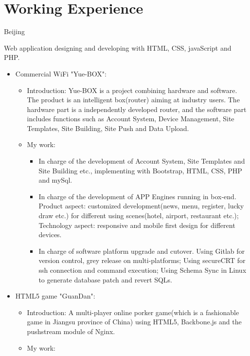 \documentclass[11pt,a4paper,sans]{moderncv}        %
\begin{document}
\section{Working Experience}
 {Beijing}{}
{Web application designing and developing with HTML, CSS, javaScript and PHP.
\newline{}%
\begin{itemize}%
\item Commercial WiFi "Yue-BOX":
  \begin{itemize}%
  \item Introduction: Yue-BOX is a project combining hardware and software. The product is an intelligent box(router) aiming at industry users. The hardware part is a independently developed router, and the software part includes functions such as Account System, Device Management, Site Templates, Site Building, Site Push and Data Upload.
  \item My work:
      \begin{itemize}%
        \item In charge of the development of Account System, Site Templates and Site Building etc., implementing with Bootstrap, HTML, CSS, PHP and mySql.
        \item In charge of the development of APP Engines running in box-end. Product aspect: customized development(news, menu, register, lucky draw etc.) for different using scenes(hotel, airport, restaurant etc.); Technology aspect: responsive and mobile first design for different devices.
        \item In charge of software platform upgrade and cutover. Using Gitlab for version control, grey release on multi-platforms; Using secureCRT for ssh connection and command execution; Using Schema Sync in Linux to generate database patch and revert SQLs.
      \end{itemize}
  \end{itemize}
\item HTML5 game "GuanDan":
  \begin{itemize}%
  \item Introduction: A multi-player online porker game(which is a fashionable game in Jiangsu province of China) using HTML5, Backbone.js and the pushstream module of Nginx.
  \item My work:

\end{itemize}
\end{itemize}}
\end{document}
